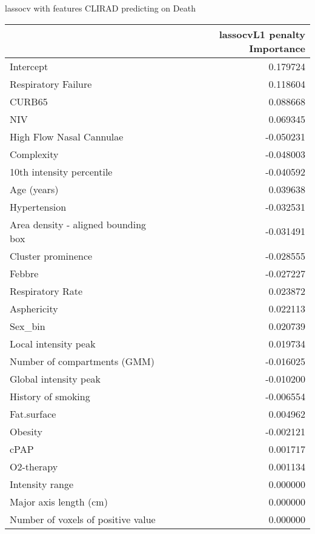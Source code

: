 {lassocv with features CLIRAD predicting on Death

\begin{tabular}{lr}
\toprule
{} &  lassocvL1 penalty Importance \\
\midrule
Intercept                           &                      0.179724 \\
Respiratory Failure                 &                      0.118604 \\
CURB65                              &                      0.088668 \\
NIV                                 &                      0.069345 \\
High Flow Nasal Cannulae            &                     -0.050231 \\
Complexity                          &                     -0.048003 \\
10th intensity percentile           &                     -0.040592 \\
Age (years)                         &                      0.039638 \\
Hypertension                        &                     -0.032531 \\
Area density - aligned bounding box &                     -0.031491 \\
Cluster prominence                  &                     -0.028555 \\
Febbre                              &                     -0.027227 \\
Respiratory Rate                    &                      0.023872 \\
Asphericity                         &                      0.022113 \\
Sex\_bin                             &                      0.020739 \\
Local intensity peak                &                      0.019734 \\
Number of compartments (GMM)        &                     -0.016025 \\
Global intensity peak               &                     -0.010200 \\
History of smoking                  &                     -0.006554 \\
Fat.surface                         &                      0.004962 \\
Obesity                             &                     -0.002121 \\
cPAP                                &                      0.001717 \\
O2-therapy                          &                      0.001134 \\
Intensity range                     &                      0.000000 \\
Major axis length (cm)              &                      0.000000 \\
Number of voxels of positive value  &                      0.000000 \\
\bottomrule
\end{tabular}

}
